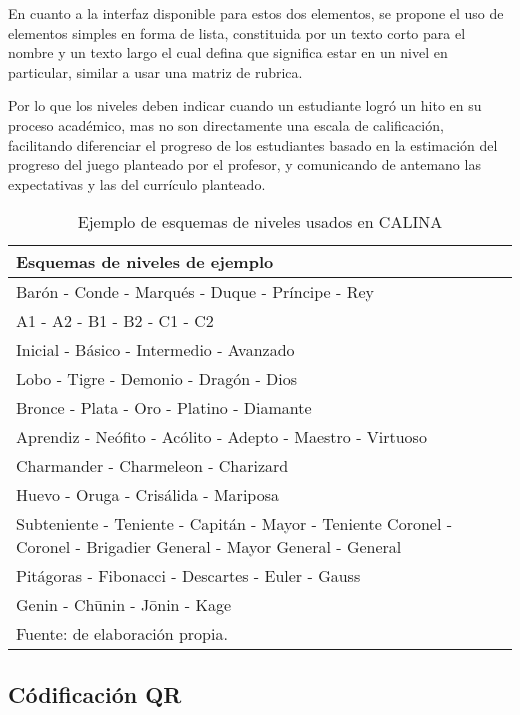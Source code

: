 En cuanto a la interfaz disponible para estos dos elementos, se propone el uso de elementos simples en forma
de lista, constituida por un texto corto para el nombre y un texto largo el cual defina que significa
estar en un nivel en particular, similar a usar una matriz de rubrica.

Por lo que los niveles deben indicar cuando un estudiante logró un hito en su proceso académico, mas no son 
directamente una escala de calificación, facilitando diferenciar el progreso de los estudiantes basado en la 
estimación del progreso del juego planteado por el profesor, y comunicando de antemano las expectativas y las 
del currículo planteado.

\begin{table}[ht]
\caption{Ejemplo de esquemas de niveles usados en CALINA}
\label{tab:esquemasniveles}
\begin{center}
\small
\begin{tabular}{ p{150mm}}
\toprule
\textbf{Esquemas de niveles de ejemplo}\\ 
\midrule
Barón - Conde - Marqués - Duque - Príncipe - Rey\\
\midrule
A1 - A2 - B1 - B2 - C1 - C2\\
\midrule
Inicial - Básico - Intermedio - Avanzado\\
\midrule
Lobo - Tigre - Demonio - Dragón - Dios\\
\midrule
Bronce - Plata - Oro - Platino - Diamante\\
\midrule
Aprendiz - Neófito - Acólito - Adepto - Maestro - Virtuoso\\
\midrule
Charmander - Charmeleon - Charizard\\
\midrule
Huevo - Oruga - Crisálida - Mariposa\\
\midrule
Subteniente - Teniente - Capitán - Mayor - Teniente Coronel - Coronel - Brigadier General - Mayor General - General\\
\midrule
Pitágoras - Fibonacci - Descartes - Euler - Gauss\\
\midrule
Genin - Chūnin - Jōnin - Kage\\
\bottomrule
\multicolumn{1}{l}{\footnotesize Fuente: de elaboración propia.}\\
\end{tabular}
\end{center}
\end{table}


\subsection{Códificación QR}

